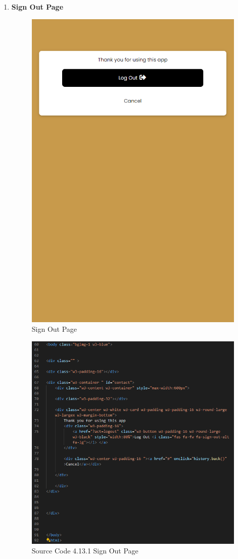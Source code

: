 \begin{enumerate}[1.]
    \item \textbf{Sign Out Page}
    \begin{figure}[h]
        \centering
        \includegraphics[width=0.5\linewidth]{mainmatter/images/frontend/ss/Sign Out.png}
        \caption{Sign Out Page}
        \label{fig:myfig52}
    \end{figure}
    \begin{figure}[h]
        \centering
        \includegraphics[width=0.7\linewidth]{mainmatter/images/frontend/code/signout.png}
        \caption*{Source Code 4.13.1 Sign Out Page}
        \label{fig:myfig52a}
    \end{figure}


\end{enumerate}
